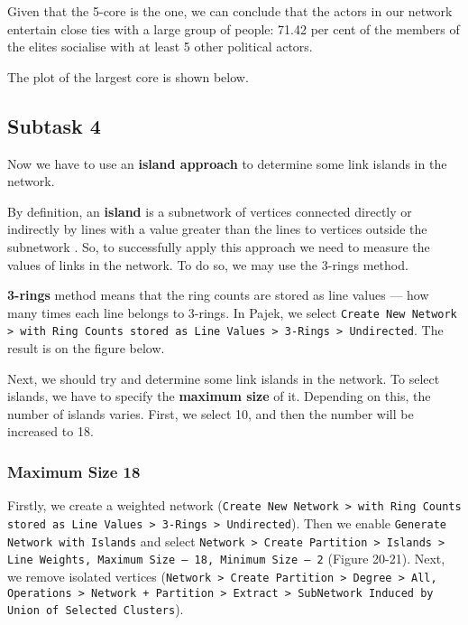 Given that the 5-core is the  one, we can conclude that the actors in our network entertain close ties with a large group of people: 71.42 per cent of the members of the elites socialise with at least 5 other political actors.

The plot of the largest core is shown below.

\FloatBarrier
\clearpage



\subsection{Subtask 4}
Now we have to use an \textbf{island approach} to determine some link islands in the network.

By definition, an \textbf{island} is a subnetwork of vertices connected directly or indirectly by lines with a value greater than the lines to vertices outside the subnetwork \cite{de_nooy_2018}. So, to successfully apply this approach we need to measure the values of links in the network. To do so, we may use the 3-rings method. 

\textbf{3-rings} method means that the ring counts are stored as line values — how many times each line belongs to 3-rings. In Pajek, we select \texttt{Create New Network > with Ring Counts stored as Line Values > 3-Rings > Undirected}. The result is on the figure below.


Next, we should try and determine some link islands in the network. To select islands, we have to specify the \textbf{maximum size} of it. Depending on this, the number of islands varies. First, we select 10, and then the number will be increased to 18.

\subsubsection{Maximum Size 18}
Firstly, we create a weighted network (\texttt{Create New Network > with Ring Counts stored as Line Values > 3-Rings > Undirected}). Then we enable \texttt{Generate Network with Islands} and select \texttt{Network > Create Partition > Islands > Line Weights, Maximum Size — 18, Minimum Size — 2} (Figure 20-21). Next, we remove isolated vertices (\texttt{Network > Create Partition > Degree > All, Operations > Network + Partition > Extract > SubNetwork Induced by Union of Selected Clusters}).

